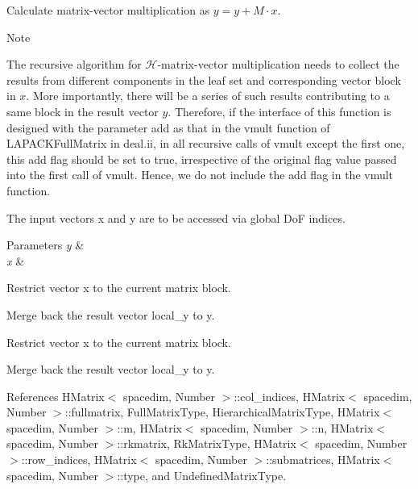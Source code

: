 Calculate matrix-\/vector multiplication as $y = y + M \cdot x$.


\begin{DoxyDescription}
\item[Note ]
\begin{DoxyEnumerate}
\item The recursive algorithm for $\mathcal{H}$-\/matrix-\/vector multiplication needs to collect the results from different components in the leaf set and corresponding vector block in $x$. More importantly, there will be a series of such results contributing to a same block in the result vector $y$. Therefore, if the interface of this function is designed with the parameter {\ttfamily add} as that in the {\ttfamily vmult} function of {\ttfamily L\+A\+P\+A\+C\+K\+Full\+Matrix} in deal.\+ii, in all recursive calls of {\ttfamily vmult} except the first one, this {\ttfamily add} flag should be set to {\ttfamily true}, irrespective of the original flag value passed into the first call of {\ttfamily vmult}. Hence, we do not include the {\ttfamily add} flag in the {\ttfamily vmult} function.
\item The input vectors {\ttfamily x} and {\ttfamily y} are to be accessed via global DoF indices.  
\end{DoxyEnumerate}
\end{DoxyDescription}


\begin{DoxyParams}{Parameters}
{\em y} & \\
\hline
{\em x} & \\
\hline
\end{DoxyParams}
Restrict vector x to the current matrix block.

Merge back the result vector {\ttfamily local\+\_\+y} to {\ttfamily y}.

Restrict vector x to the current matrix block.

Merge back the result vector {\ttfamily local\+\_\+y} to {\ttfamily y}.

References H\+Matrix$<$ spacedim, Number $>$\+::col\+\_\+indices, H\+Matrix$<$ spacedim, Number $>$\+::fullmatrix, Full\+Matrix\+Type, Hierarchical\+Matrix\+Type, H\+Matrix$<$ spacedim, Number $>$\+::m, H\+Matrix$<$ spacedim, Number $>$\+::n, H\+Matrix$<$ spacedim, Number $>$\+::rkmatrix, Rk\+Matrix\+Type, H\+Matrix$<$ spacedim, Number $>$\+::row\+\_\+indices, H\+Matrix$<$ spacedim, Number $>$\+::submatrices, H\+Matrix$<$ spacedim, Number $>$\+::type, and Undefined\+Matrix\+Type.



